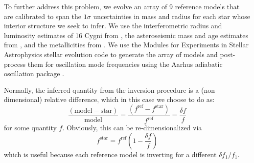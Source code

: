 \documentclass[twocolumn,twocolappendix]{aastex6}
\begin{document}
To further address this problem, we evolve an array of 9 reference models that are calibrated to span the $1\sigma$ uncertainties in mass and radius for each star whose interior structure we seek to infer. 
We use the interferometric radius and luminosity estimates of 16 Cygni from \citet{2013MNRAS.433.1262W}, the asteroseismic mass and age estimates from \citet{Bellinger2016}, and the metallicities from \citet{2009A&A...508L..17R}. We use the Modules for Experiments in Stellar Astrophysics \citep[MESA, r9575,][]{Paxton2011} stellar evolution code to generate the array of models and post-process them for oscillation mode frequencies using the Aarhus adiabatic oscillation package \citep[ADIPLS,][]{2008ApSS.316..113C}. 

Normally, the inferred quantity from the inversion procedure is a (non-dimensional) relative difference, which in this case we choose to do as: 
\begin{equation}
    \frac{(\text{model} - \text{star})}{\text{model}} = 
    \frac{ (f^{\text{ref}} - f^{\text{star}}) }{f^{\text{ref}}}
    =
    \frac{\delta f}{f}
\end{equation} 
for some quantity $f$. Obviously, this can be re-dimensionalized via
\begin{equation} \label{eq:dimensional}
     f^{\text{star}} = f^{\text{ref}} \left( 1 - \frac{\delta f}{f} \right)
\end{equation}
which is useful because each reference model is inverting for a different $\delta f_1/f_1$. 
\end{document}
